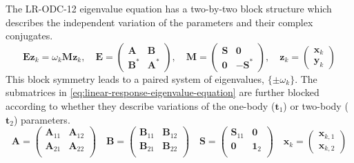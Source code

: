 The LR-ODC-12 eigenvalue equation has a two-by-two block structure which
describes the independent variation of the parameters and their complex
conjugates.
\begin{equation}
    \label{eq:linear-response-eigenvalue-equation}
    \mathbf{E}\mathbf{z}_k
    =
    \omega_k
    \mathbf{M}\mathbf{z}_k
    ,
    \quad
    \mathbf{E}
    =
    \begin{pmatrix}
        \mathbf{A} & \mathbf{B} \\
        \mathbf{B}^* & \mathbf{A}^*
    \end{pmatrix}
    ,
    \quad
    \mathbf{M}
    =
    \begin{pmatrix}
        \mathbf{S} & \mathbf{0} \\
        \mathbf{0} & -\mathbf{S}^*
    \end{pmatrix}
    ,
    \quad
    \mathbf{z}_k
    =
    \begin{pmatrix}
        \mathbf{x}_k \\
        \mathbf{y}_k
    \end{pmatrix}
\end{equation}
This block symmetry leads to a paired system of eigenvalues,
\(
    \{\pm\omega_k\}
\).
The submatrices in \cref{eq:linear-response-eigenvalue-equation} are further
blocked according to whether they describe variations of the one-body
(\(\mathbf{t}_1\)) or two-body (\(\mathbf{t}_2\)) parameters.
\begin{equation}
    \label{eq:conjugate-blocks}
    \mathbf{A}
    =
    \begin{pmatrix}
        \mathbf{A}_{11} & \mathbf{A}_{12} \\
        \mathbf{A}_{21} & \mathbf{A}_{22} \\
    \end{pmatrix}
    \quad
    \mathbf{B}
    =
    \begin{pmatrix}
        \mathbf{B}_{11} & \mathbf{B}_{12} \\
        \mathbf{B}_{21} & \mathbf{B}_{22} \\
    \end{pmatrix}
    \quad
    \mathbf{S}
    =
    \begin{pmatrix}
        \mathbf{S}_{11} & \mathbf{0} \\
        \mathbf{0} & \mathbf{1}_2 \\
    \end{pmatrix}
    \quad
    \mathbf{x}_k
    =
    \begin{pmatrix}
        \mathbf{x}_{k,1} \\
        \mathbf{x}_{k,2}
    \end{pmatrix}
\end{equation}
